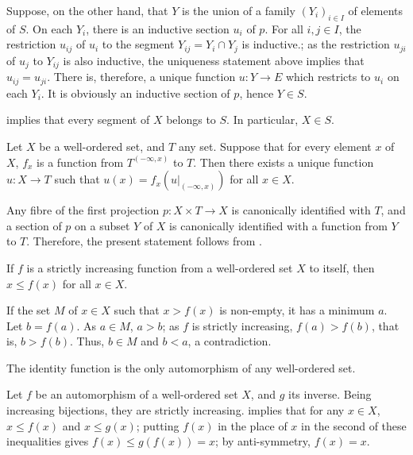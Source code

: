 \documentclass{article}
\begin{document}
Suppose, on the other hand, that \(Y\) is the union of a family
\((Y_i)_{i \in I}\) of elements of \(S\).  On each \(Y_i\), there is
an inductive section \(u_i\) of \(p\).  For all \(i, j \in I\), the
restriction \(u_{ij}\) of \(u_i\) to the segment
\(Y_{ij} = Y_i \cap Y_j\) is inductive.; as the restriction \(u_{ji}\)
of \(u_j\) to \(Y_{ij}\) is also inductive, the uniqueness statement
above implies that \(u_{ij} = u_{ji}\).  There is, therefore, a unique
function \(u : Y \to E\) which restricts to \(u_i\) on each \(Y_i\).
It is obviously an inductive section of \(p\), hence \(Y \in S\).

 implies that every segment of \(X\) belongs to
\(S\).  In particular, \(X \in S\).

\begin{theorem}
  \label{thm:5kg5ewo1}
  Let \(X\) be a well-ordered set, and \(T\) any set.  Suppose that
  for every element \(x\) of \(X\), \(f_x\) is a function from
  \(T^{(-\infty, x)}\) to \(T\).  Then there exists a unique function
  \(u : X \to T\) such that \(u(x) = f_x(u \vert_{(-\infty, x)})\) for
  all \(x \in X\).
\end{theorem}

Any fibre of the first projection \(p : X \times T \to X\) is
canonically identified with \(T\), and a section of \(p\) on a subset
\(Y\) of \(X\) is canonically identified with a function from \(Y\) to
\(T\).  Therefore, the present statement follows from
.

\begin{theorem}
  \label{thm:hw1jxum0}
  If \(f\) is a strictly increasing function from a well-ordered set
  \(X\) to itself, then \(x \leq f(x)\) for all \(x \in X\).
\end{theorem}

If the set \(M\) of \(x \in X\) such that \(x > f(x)\) is non-empty,
it has a minimum \(a\).  Let \(b = f(a)\).  As \(a \in M\), \(a > b\);
as \(f\) is strictly increasing, \(f(a) > f(b)\), that is,
\(b > f(b)\).  Thus, \(b \in M\) and \(b < a\), a contradiction.

\begin{theorem}
  \label{thm:yvftewxp}
  The identity function is the only automorphism of any well-ordered
  set.
\end{theorem}

Let \(f\) be an automorphism of a well-ordered set \(X\), and \(g\)
its inverse.  Being increasing bijections, they are strictly
increasing.   implies that for any \(x \in X\),
\(x \leq f(x)\) and \(x \leq g(x)\); putting \(f(x)\) in the place of
\(x\) in the second of these inequalities gives
\(f(x) \leq g(f(x)) = x\); by anti-symmetry, \(f(x) = x\).
\end{document}
